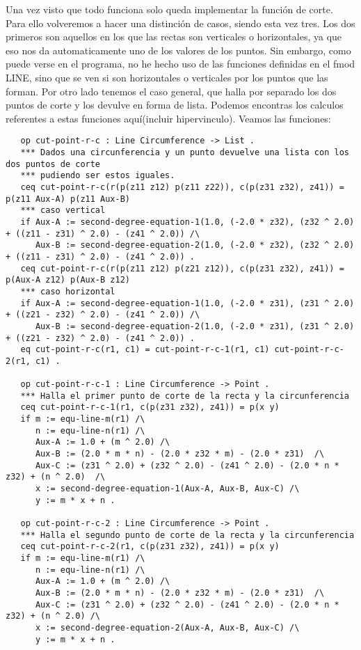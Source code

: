 Una vez visto que todo funciona solo queda implementar la funci\'on de corte. Para ello volveremos a hacer una distinci\'on de casos, siendo esta vez tres. Los dos primeros son aquellos en los que las rectas son verticales o horizontales, ya que eso nos da automaticamente uno de los valores de los puntos. Sin embargo, como puede verse en el programa, no he hecho uso de las funciones definidas en el fmod LINE, sino que se ven si son horizontales o verticales por los puntos que las forman. Por otro lado tenemos el caso general, que halla por separado los dos puntos de corte y los devulve en forma de lista. Podemos encontras los calculos referentes a estas funciones aqu\'i(incluir hipervinculo). Veamos las funciones:

\begin{verbatim}
   op cut-point-r-c : Line Circumference -> List .
   *** Dados una circunferencia y un punto devuelve una lista con los dos puntos de corte
   *** pudiendo ser estos iguales.
   ceq cut-point-r-c(r(p(z11 z12) p(z11 z22)), c(p(z31 z32), z41)) = p(z11 Aux-A) p(z11 Aux-B)
   *** caso vertical 
   if Aux-A := second-degree-equation-1(1.0, (-2.0 * z32), (z32 ^ 2.0) + ((z11 - z31) ^ 2.0) - (z41 ^ 2.0)) /\
      Aux-B := second-degree-equation-2(1.0, (-2.0 * z32), (z32 ^ 2.0) + ((z11 - z31) ^ 2.0) - (z41 ^ 2.0)) .
   ceq cut-point-r-c(r(p(z11 z12) p(z21 z12)), c(p(z31 z32), z41)) = p(Aux-A z12) p(Aux-B z12)
   *** caso horizontal
   if Aux-A := second-degree-equation-1(1.0, (-2.0 * z31), (z31 ^ 2.0) + ((z21 - z32) ^ 2.0) - (z41 ^ 2.0)) /\
      Aux-B := second-degree-equation-2(1.0, (-2.0 * z31), (z31 ^ 2.0) + ((z21 - z32) ^ 2.0) - (z41 ^ 2.0)) .
   eq cut-point-r-c(r1, c1) = cut-point-r-c-1(r1, c1) cut-point-r-c-2(r1, c1) .

   op cut-point-r-c-1 : Line Circumference -> Point .
   *** Halla el primer punto de corte de la recta y la circunferencia
   ceq cut-point-r-c-1(r1, c(p(z31 z32), z41)) = p(x y)
   if m := equ-line-m(r1) /\
      n := equ-line-n(r1) /\
      Aux-A := 1.0 + (m ^ 2.0) /\
      Aux-B := (2.0 * m * n) - (2.0 * z32 * m) - (2.0 * z31)  /\
      Aux-C := (z31 ^ 2.0) + (z32 ^ 2.0) - (z41 ^ 2.0) - (2.0 * n * z32) + (n ^ 2.0)  /\
      x := second-degree-equation-1(Aux-A, Aux-B, Aux-C) /\
      y := m * x + n .

   op cut-point-r-c-2 : Line Circumference -> Point .
   *** Halla el segundo punto de corte de la recta y la circunferencia
   ceq cut-point-r-c-2(r1, c(p(z31 z32), z41)) = p(x y)
   if m := equ-line-m(r1) /\
      n := equ-line-n(r1) /\
      Aux-A := 1.0 + (m ^ 2.0) /\
      Aux-B := (2.0 * m * n) - (2.0 * z32 * m) - (2.0 * z31)  /\
      Aux-C := (z31 ^ 2.0) + (z32 ^ 2.0) - (z41 ^ 2.0) - (2.0 * n * z32) + (n ^ 2.0) /\
      x := second-degree-equation-2(Aux-A, Aux-B, Aux-C) /\
      y := m * x + n .

\end{verbatim}

